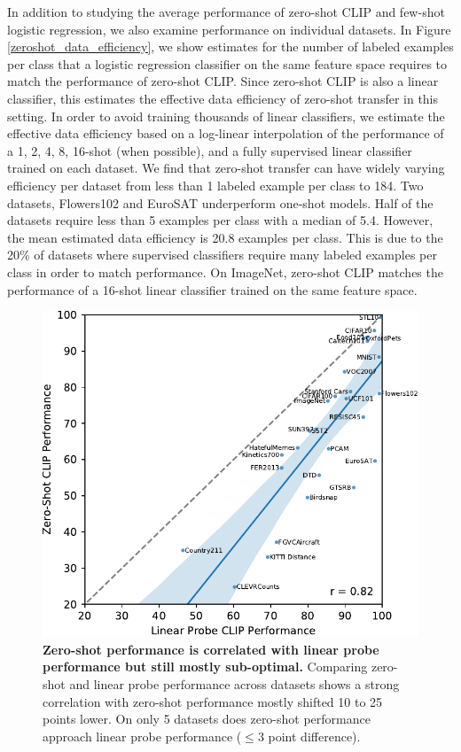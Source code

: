 \documentclass{article}
\begin{document}
In addition to studying the average performance of zero-shot CLIP and few-shot logistic regression, we also examine performance on individual datasets. In Figure \ref{zeroshot_data_efficiency}, we show estimates for the number of labeled examples per class that a logistic regression classifier on the same feature space requires to match the performance of zero-shot CLIP. Since zero-shot CLIP is also a linear classifier, this estimates the effective data efficiency of zero-shot transfer in this setting. In order to avoid training thousands of linear classifiers, we estimate the effective data efficiency based on a log-linear interpolation of the performance of a 1, 2, 4, 8, 16-shot (when possible), and a fully supervised linear classifier trained on each dataset. We find that zero-shot transfer can have widely varying efficiency per dataset from less than 1 labeled example per class to 184. Two datasets, Flowers102 and EuroSAT underperform one-shot models. Half of the datasets require less than 5 examples per class with a median of 5.4. However, the mean estimated data efficiency is 20.8 examples per class. This is due to the 20\% of datasets where supervised classifiers require many labeled examples per class in order to match performance. On ImageNet, zero-shot CLIP matches the performance of a 16-shot linear classifier trained on the same feature space. 





\begin{figure}[t]
\begin{center}
\centerline{\includegraphics[width=1.0\columnwidth]{zs-vs-linear-clip.pdf}}
\caption{\textbf{Zero-shot performance is correlated with linear probe performance but still mostly sub-optimal.} Comparing zero-shot and linear probe performance across datasets shows a strong correlation with zero-shot performance mostly shifted 10 to 25 points lower. On only 5 datasets does zero-shot performance approach linear probe performance ($\le$3 point difference).}
\label{zeroshot_vs_linear_probe}
\end{center}
\vspace{-2em}
\end{figure}
\end{document}
